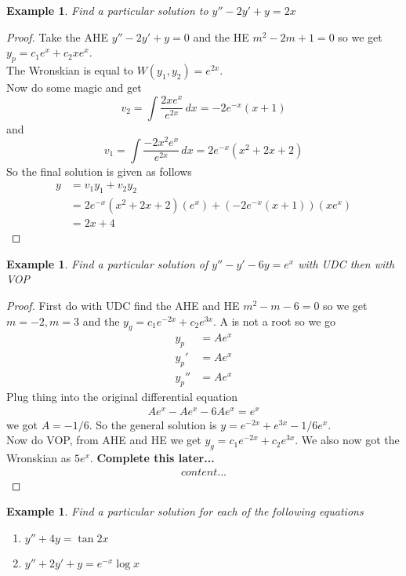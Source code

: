 \documentclass[oneside,11pt,pdftex,final]{book}%
\numberwithin{equation}{section}
\newtheorem{example}[theorem]{Example}
\numberwithin{section}{chapter}
\numberwithin{equation}{chapter}
\begin{document}
\begin{example}
	Find a particular solution to $ y''-2y'+y=2x $
\end{example}
\begin{proof}
	Take the AHE $ y''-2y'+y=0 $
	and the HE $ m^2-2m+1=0 $ so we get $ y_p=c_1 e^{x}+c_2 x e^{x} $.\\
	The Wronskian is equal to $ W(y_1,y_2)= e^{2x}$.\\
	Now do some magic and get $$ v_2= \int \frac{2x e^{x}}{e^{2x}}\, dx = -2e^{-x}(x+1) $$
	and \[ v_1= \int \frac{-2x^2e^{x} }{e^{2x}}\, dx = 2e^{-x}(x^2+2x+2)\]
	So the final solution is given as follows
	\begin{align*}
		y&=v_1y_1+v_2y_2\\
		&=2e^{-x}(x^2+2x+2)(e^{x})+(-2e^{-x}(x+1))(xe^{x})\\
		&=2x+4
	\end{align*}
\end{proof}

\begin{example}
	Find a particular solution of $ y''-y'-6y=e^{x} $ with UDC then with VOP
\end{example}
\begin{proof}
	First do with UDC find the AHE and HE $ m^2-m-6=0 $ so we get $ m=-2, m=3 $ and the $ y_g = c_1e^{-2x}+c_2e^{3x}$. A is not a root so we go
	\begin{align*}
		y_p&=Ae^{x}\\
		y_p'&=Ae^{x}\\
		y_p''&=Ae^{x}
	\end{align*}
Plug thing into the original differential equation
\begin{align*}
	Ae^x-Ae^{x}-6Ae^x=e^x
\end{align*}
we got $ A=-1/6 $. So the general solution is $ y=e^{-2x}+e^{3x}-1/6e^{x} $.
\\
Now do VOP, from AHE and HE we get $ y_g=c_1e^{-2x}+c_2e^{3x} $.
We also now got the Wronskian as $ 5e^x $.
\textbf{Complete this later...}
\begin{align*}
	content...
\end{align*}
\end{proof}

\begin{example}
	Find a particular solution for each of the following equations
	\begin{enumerate}
		\item $ y''+4y=\tan 2x $
		\item $y''+2y'+y=e^{-x}\log x$
	\end{enumerate}
\end{example}
\end{document}
